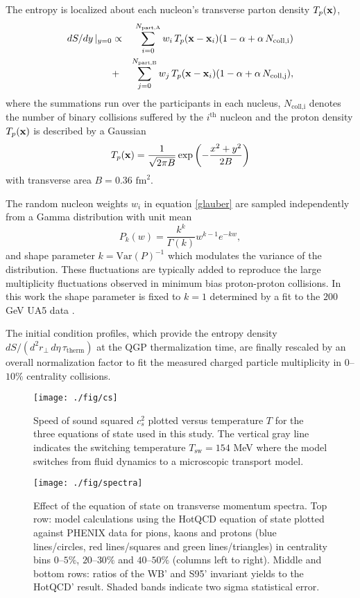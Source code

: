 \documentclass[aps,prc,reprint,amsmath,nofootinbib,superscriptaddress]{revtex4-1}
\begin{document}
The entropy is localized about each nucleon's transverse parton density $T_p({\bf x})$,
\begin{eqnarray}
 dS/dy \,\vert_{y=0} &\propto& \sum\limits_{i=0}^{N_\text{part,A}} w_i\, T_p({\bf x} - {\bf x}_i)(1-\alpha + \alpha\, N_\text{coll,i}) \nonumber \\
                     &+& \sum\limits_{j=0}^{N_\text{part,B}} w_j\, T_p({\bf x} - {\bf x}_i)(1-\alpha + \alpha\, N_\text{coll,j}),
 \label{glauber}
\end{eqnarray}
where the summations run over the participants in each nucleus, $N_\text{coll,i}$ denotes the number of binary collisions suffered by the $i^\text{th}$ nucleon 
and the proton density $T_p({\bf x})$ is described by a Gaussian
\begin{equation}
 T_p({\bf x}) = \frac{1}{\sqrt{2 \pi B}} \exp \left(-\frac{x^2+y^2}{2 B} \right)
\end{equation}
with transverse area $B = 0.36$ $\text{fm}^2$.

The random nucleon weights $w_i$ in equation \eqref{glauber} are sampled independently from a Gamma distribution with unit mean
\begin{equation}
 P_k(w) = \frac{k^k}{\Gamma(k)} w^{k-1} e^{-k w},
\end{equation}
and shape parameter $k = \text{Var}(P)^{-1}$ which modulates the variance of the distribution. 
These fluctuations are typically added \cite{?} to reproduce the large multiplicity fluctuations observed in minimum bias proton-proton collisions. 
In this work the shape parameter is fixed to $k=1$ determined by a fit to the $200$ GeV UA5 data \cite{?}. 

The initial condition profiles, which provide the entropy density $dS/(d^2r_\perp\, d\eta\, \tau_\text{therm})$ at the QGP thermalization time, are finally 
rescaled by an overall normalization factor to fit the measured charged particle multiplicity in $0$--$10\%$ centrality collisions.

\begin{figure}
  \texttt{[image: ./fig/cs]}
  \caption{\label{fig:cs} Speed of sound squared $c_s^2$ plotted versus temperature $T$ for the three equations of state used in this study. The vertical
	   gray line indicates the switching temperature $T_\text{sw} = 154$ MeV where the model switches from fluid dynamics to a microscopic transport model.}
\end{figure}

\begin{figure*}[t]
  \texttt{[image: ./fig/spectra]}
  \caption{
    \label{fig:spectra} Effect of the equation of state on transverse momentum spectra. Top row: model calculations using the HotQCD equation of state plotted against 
    PHENIX data for pions, kaons and protons (blue lines/circles, red lines/squares and green lines/triangles) in centrality bins $0$--$5\%$, $20$--$30\%$ and $40$--$50\%$ 
    (columns left to right). Middle and bottom rows: ratios of the WB' and S95' invariant yields to the HotQCD' result. Shaded bands indicate two sigma statistical error. }
\end{figure*}
\end{document}
